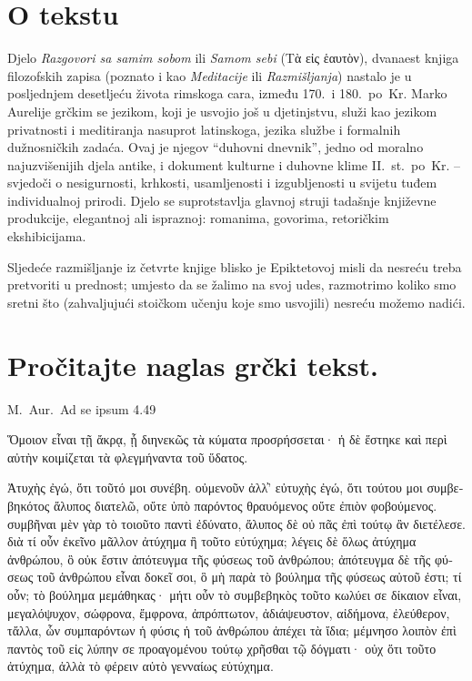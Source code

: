 

\section*{O tekstu}

Djelo \textit{Razgovori sa samim sobom} ili \textit{Samom sebi} \textgreek[variant=ancient]{(Τὰ εἰς ἑαυτὸν),} dvanaest knjiga filozofskih zapisa (poznato i kao \textit{Meditacije} ili \textit{Razmišljanja}) nastalo je u posljednjem desetljeću života rimskoga cara, između 170.\ i 180.\ po~Kr. Marko Aurelije grčkim se jezikom, koji je usvojio još u djetinjstvu, služi kao jezikom privatnosti i meditiranja nasuprot latinskoga, jezika službe i formalnih dužnosničkih zadaća. Ovaj je njegov ``duhovni dnevnik'', jedno od moralno najuzvišenijih djela antike, i dokument kulturne i duhovne klime II.~st.\ po~Kr. – svjedoči o nesigurnosti, krhkosti, usamljenosti i izgubljenosti u svijetu tuđem individualnoj prirodi. Djelo se suprotstavlja glavnoj struji tadašnje književne produkcije, elegantnoj ali ispraznoj: romanima, govorima, retoričkim ekshibicijama.

Sljedeće razmišljanje iz četvrte knjige blisko je Epiktetovoj misli da nesreću treba pretvoriti u prednost; umjesto da se žalimo na svoj udes, razmotrimo koliko smo sretni što (zahvaljujući stoičkom učenju koje smo usvojili) nesreću možemo nadići.

\section*{Pročitajte naglas grčki tekst.}

M.\ Aur.\ Ad se ipsum 4.49


\medskip


{\large

\begin{greek}

\noindent Ὅμοιον εἶναι τῇ ἄκρᾳ, ᾗ διηνεκῶς τὰ κύματα προσρήσσεται· ἡ δὲ ἕστηκε καὶ περὶ αὐτὴν κοιμίζεται τὰ φλεγμήναντα τοῦ ὕδατος. 

\noindent Ἀτυχὴς ἐγώ, ὅτι τοῦτό μοι συνέβη. οὐμενοῦν ἀλλ̓' εὐτυχὴς ἐγώ, ὅτι τούτου μοι συμβεβηκότος ἄλυπος διατελῶ, οὔτε ὑπὸ παρόντος θραυόμενος οὔτε ἐπιὸν φοβούμενος. συμβῆναι μὲν γὰρ τὸ τοιοῦτο παντὶ ἐδύνατο, ἄλυπος δὲ οὐ πᾶς ἐπὶ τούτῳ ἂν διετέλεσε. διὰ τί οὖν ἐκεῖνο μᾶλλον ἀτύχημα ἢ τοῦτο εὐτύχημα; λέγεις δὲ ὅλως ἀτύχημα ἀνθρώπου, ὃ οὐκ ἔστιν ἀπότευγμα τῆς φύσεως τοῦ ἀνθρώπου; ἀπότευγμα δὲ τῆς φύσεως τοῦ ἀνθρώπου εἶναι δοκεῖ σοι, ὃ μὴ παρὰ τὸ βούλημα τῆς φύσεως αὐτοῦ ἐστι; τί οὖν; τὸ βούλημα μεμάθηκας· μήτι οὖν τὸ συμβεβηκὸς τοῦτο κωλύει σε δίκαιον εἶναι, μεγαλόψυχον, σώφρονα, ἔμφρονα, ἀπρόπτωτον, ἀδιάψευστον, αἰδήμονα, ἐλεύθερον, τἄλλα, ὧν συμπαρόντων ἡ φύσις ἡ τοῦ ἀνθρώπου ἀπέχει τὰ ἴδια; μέμνησο λοιπὸν ἐπὶ παντὸς τοῦ εἰς λύπην σε προαγομένου τούτῳ χρῆσθαι τῷ δόγματι· οὐχ ὅτι τοῦτο ἀτύχημα, ἀλλὰ τὸ φέρειν αὐτὸ γενναίως εὐτύχημα.

\end{greek}

}



